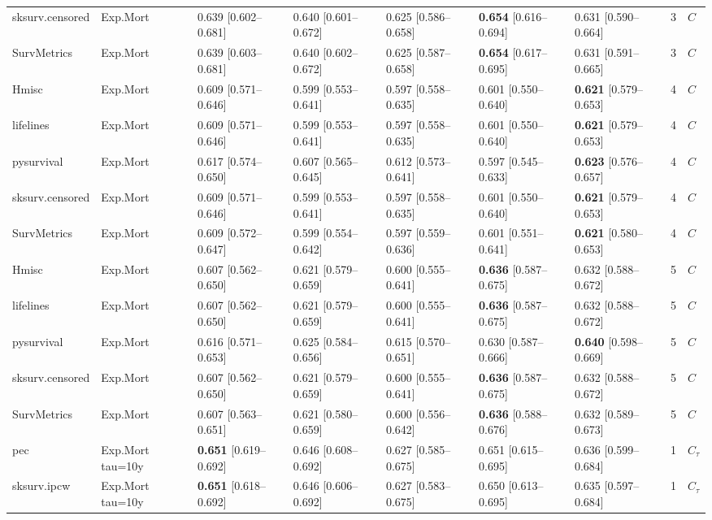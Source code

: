 \begin{tabular}{lllllllrl}
sksurv.censored & Exp.Mort & 0.639 [0.602–0.681] & 0.640 [0.601–0.672] & 0.625 [0.586–0.658] & \textbf{0.654} [0.616–0.694] & 0.631 [0.590–0.664] & 3 & $C$\\
SurvMetrics & Exp.Mort & 0.639 [0.603–0.681] & 0.640 [0.602–0.672] & 0.625 [0.587–0.658] & \textbf{0.654} [0.617–0.695] & 0.631 [0.591–0.665] & 3 & $C$\\
\addlinespace
Hmisc & Exp.Mort & 0.609 [0.571–0.646] & 0.599 [0.553–0.641] & 0.597 [0.558–0.635] & 0.601 [0.550–0.640] & \textbf{0.621} [0.579–0.653] & 4 & $C$\\
lifelines & Exp.Mort & 0.609 [0.571–0.646] & 0.599 [0.553–0.641] & 0.597 [0.558–0.635] & 0.601 [0.550–0.640] & \textbf{0.621} [0.579–0.653] & 4 & $C$\\
pysurvival & Exp.Mort & 0.617 [0.574–0.650] & 0.607 [0.565–0.645] & 0.612 [0.573–0.641] & 0.597 [0.545–0.633] & \textbf{0.623} [0.576–0.657] & 4 & $C$\\
sksurv.censored & Exp.Mort & 0.609 [0.571–0.646] & 0.599 [0.553–0.641] & 0.597 [0.558–0.635] & 0.601 [0.550–0.640] & \textbf{0.621} [0.579–0.653] & 4 & $C$\\
SurvMetrics & Exp.Mort & 0.609 [0.572–0.647] & 0.599 [0.554–0.642] & 0.597 [0.559–0.636] & 0.601 [0.551–0.641] & \textbf{0.621} [0.580–0.653] & 4 & $C$\\
\addlinespace
Hmisc & Exp.Mort & 0.607 [0.562–0.650] & 0.621 [0.579–0.659] & 0.600 [0.555–0.641] & \textbf{0.636} [0.587–0.675] & 0.632 [0.588–0.672] & 5 & $C$\\
lifelines & Exp.Mort & 0.607 [0.562–0.650] & 0.621 [0.579–0.659] & 0.600 [0.555–0.641] & \textbf{0.636} [0.587–0.675] & 0.632 [0.588–0.672] & 5 & $C$\\
pysurvival & Exp.Mort & 0.616 [0.571–0.653] & 0.625 [0.584–0.656] & 0.615 [0.570–0.651] & 0.630 [0.587–0.666] & \textbf{0.640} [0.598–0.669] & 5 & $C$\\
sksurv.censored & Exp.Mort & 0.607 [0.562–0.650] & 0.621 [0.579–0.659] & 0.600 [0.555–0.641] & \textbf{0.636} [0.587–0.675] & 0.632 [0.588–0.672] & 5 & $C$\\
SurvMetrics & Exp.Mort & 0.607 [0.563–0.651] & 0.621 [0.580–0.659] & 0.600 [0.556–0.642] & \textbf{0.636} [0.588–0.676] & 0.632 [0.589–0.673] & 5 & $C$\\
\addlinespace
pec & Exp.Mort tau=10y & \textbf{0.651} [0.619–0.692] & 0.646 [0.608–0.692] & 0.627 [0.585–0.675] & 0.651 [0.615–0.695] & 0.636 [0.599–0.684] & 1 & $C_{\tau}$\\
sksurv.ipcw & Exp.Mort tau=10y & \textbf{0.651} [0.618–0.692] & 0.646 [0.606–0.692] & 0.627 [0.583–0.675] & 0.650 [0.613–0.695] & 0.635 [0.597–0.684] & 1 & $C_{\tau}$\\

\end{tabular}
